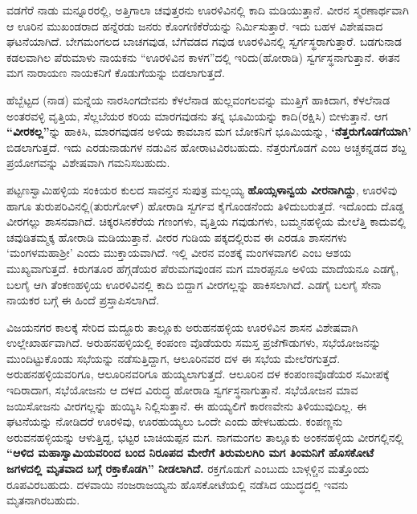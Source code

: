 ವಡಗೆರೆ ನಾಡು ಮನ್ನೂರರಲ್ಲಿ, ಅತ್ತಿಗಾಲಾ ಚವುತ್ತರನು ಊರಳಿವಿನಲ್ಲಿ ಕಾದಿ ಮಡಿಯುತ್ತಾನೆ. ವೀರನ ಸ್ಮರಣಾರ್ಥವಾಗಿ ಆ ಊರಿನ ಮುಖಂಡರಾದ ಹನ್ನೆರಡು ಜನರು ಕೊಂಗಣಿಕೆರೆಯನ್ನು ನಿರ್ಮಿಸುತ್ತಾರೆ. ಇದು ಬಹಳ ವಿಶೇಷವಾದ ಘಟನೆಯಾಗಿದೆ. ಬೇಗಮಂಗಲದ ಬಾಚಗವುಡ, ಬೆಗೆವಡದ ಗವುಡ ಊರಳಿವಿನಲ್ಲಿ ಸ್ವರ್ಗಸ್ಥರಾಗುತ್ತಾರೆ. ಬಡಗುನಾಡ ಕಡಲವಾಗಿಲ ಪೆರುಮಾಳು ನಾಯಕನು “ಊರಳಿವಿನ ಕಾಳಗ”ದಲ್ಲಿ ಇರಿದು(ಹೋರಾಡಿ) ಸ್ವರ್ಗಸ್ಥನಾಗುತ್ತಾನೆ. ಈತನ ಮಗ ನಾರಾಯಣ ನಾಯಕನಿಗೆ ಕೊಡುಗೆಯನ್ನು ಬಿಡಲಾಗುತ್ತದೆ.

ಹೆಬ್ಬೆಟ್ಟದ (ನಾಡ) ಮನ್ನೆಯ ನಾರಸಿಂಗದೇವನು ಕೆಳಲೆನಾಡ ಹುಲ್ಲವಂಗಲವನ್ನು ಮುತ್ತಿಗೆ ಹಾಕಿದಾಗ, ಕೆಳಲೆನಾಡ ಅಂತರವಳ್ಳಿ ವೃತ್ತಿಯ, ಸೆಲ್ಲಬೆಯರ ಕರಿಯ ಮಾರಗವುಡನು ತನ್ನ ಭೂಮಿಯನ್ನು ಕಾದಿ(ರಕ್ಷಿಸಿ) ಬೀಳುತ್ತಾನೆ. ಆಗ \textbf{“ವೀರಕಲ್ಲ”}ನ್ನು ಹಾಕಿಸಿ, ಮಾರಗವುಡನ ಅಳಿಯ ಕಾವಬಾನ ಮಗ ಬೋಕನಿಗೆ ಭೂಮಿಯನ್ನು, \textbf{‘ನೆತ್ತರುಗೊಡಗೆಯಾಗಿ’} ಬಿಡಲಾಗುತ್ತದೆ. ಇದು ಎರಡುನಾಡುಗಳ ನಡುವಿನ ಹೋರಾಟವಿರಬಹುದು. ನೆತ್ತರುಗೊಡಗೆ ಎಂಬ ಅಚ್ಚಕನ್ನಡದ ಶಬ್ದ ಪ್ರಯೋಗವನ್ನು ವಿಶೇಷವಾಗಿ ಗಮನಿಸಬಹುದು.

ಪಟ್ಟಣಸ್ವಾಮಿಹಳ್ಳಿಯ ಸಂಕಿಯರ ಕುಲದ ಸಾವನ್ತನ ಸುಪುತ್ರ ಮಲ್ಲಯ್ಯ \textbf{ಹೊಯ್ಸಳಾನ್ವಯ ವೀರನಾಗಿದ್ದು}, ಊರಳಿವು ಹಾಗೂ ತುರುಪರಿವಿನಲ್ಲಿ(ತುರುಗೋಳ್​) ಹೋರಾಡಿ ಸ್ವರ್ಗವ ಕೈಗೊಂಡನೆಂದು ತಿಳಿದುಬರುತ್ತದೆ. ಇದೊಂದು ದೊಡ್ಡ ವೀರಗಲ್ಲು ಶಾಸನವಾಗಿದೆ. ಚಿಕ್ಕರಸಿನಕೆರೆಯ ಗಣಂಗಳು, ವೃತ್ತಿಯ ಗವುಡುಗಳು, ಬಮ್ಮನಹಳ್ಳಿಯ ಮೇಲೆತ್ತಿ ಕಾದುವಲ್ಲಿ ಚವುಡಿತಮ್ಮಕ್ಕ ಹೋರಾಡಿ ಮಡಿಯುತ್ತಾನೆ. ವೀರರ ಗುಡಿಯ ಪಕ್ಕದಲ್ಲಿರುವ ಈ ಎರಡೂ ಶಾಸನಗಳು ‘ಮಂಗಳಮಹಾಶ‍್ರೀ’ ಎಂದು ಮುಕ್ತಾಯವಾಗಿದೆ. ಇಲ್ಲಿ ವೀರನ ವಂಶಕ್ಕೆ ಮಂಗಳವಾಗಲಿ ಎಂಬ ಆಶಯ ಮುಖ್ಯವಾಗುತ್ತದೆ. ಕಿರುಗತೂರ ಹೆಗ್ಗಡೆಯರ ಪೆರುಮಗವುಂಡನ ಮಗ ಮಾರಪ್ಪನೂ ಅಳಿಯ ಮಾದೆಯನೂ ಎಡಗೈ, ಬಲಗೈ ಆಗಿ ತೆಂಕಣಹಳ್ಳಿಯ ಊರಳಿವಿನಲ್ಲಿ ಕಾದಿ ಬಿದ್ದಾಗ ವೀರಗಲ್ಲನ್ನು ಹಾಕಿಸಲಾಗಿದೆ. ಎಡಗೈ ಬಲಗೈ ಸೇನಾ ನಾಯಕರ ಬಗ್ಗೆ ಈ ಹಿಂದೆ ಪ್ರಸ್ತಾಪಿಸಲಾಗಿದೆ.

ವಿಜಯನಗರ ಕಾಲಕ್ಕೆ ಸೇರಿದ ಮದ್ದೂರು ತಾಲ್ಲೂಕು ಅರುಹನಹಳ್ಳಿಯ ಊರಳಿವಿನ ಶಾಸನ ವಿಶೇಷವಾಗಿ ಉಲ್ಲೇಖಾರ್ಹವಾಗಿದೆ. ಅರುಹನಹಳ್ಳಿಯಲ್ಲಿ ಕಂಪಂಣ ವೊಡೆಯರು ಸಮಸ್ತ ಪ್ರಜೆಗೌಡುಗಳು, ಸಭೆಯೋಜನನ್ನು ಮುಂದಿಟ್ಟು\-ಕೊಂಡು ಸಭೆಯನ್ನು ನಡೆಸುತ್ತಿದ್ದಾಗ, ಆಲೂರಿನವರ ದಳ ಈ ಸಭೆಯ ಮೇಲೆರಗುತ್ತದೆ. ಅರುಹನಹಳ್ಳಿಯವರಿಗೂ, ಆಲೂರಿನವರಿಗೂ ಹುಯ್ಯಲಾಗುತ್ತದೆ. ಆಲೂರಿನ ದಳ ಕಂಪಂಣವೊಡೆಯರ ಸಮೀಪಕ್ಕೆ ಇದಿರಾದಾಗ, ಸಭೆಯೋಜನು ಆ ದಳದ ವಿರುದ್ಧ ಹೋರಾಡಿ ಸ್ವರ್ಗಸ್ಥನಾಗುತ್ತಾನೆ. ಸಭೆಯೋಜನ ಮಾವ ಜಯಿಸೋಜನು ವೀರಗಲ್ಲನ್ನು ಹುಯ್ಯಿಸಿ ನಿಲ್ಲಿಸುತ್ತಾನೆ. ಈ ಹುಯ್ಯಲಿಗೆ ಕಾರಣವೇನು ತಿಳಿಯುವುದಿಲ್ಲ. ಈ ಘಟನೆಯನ್ನು ನೋಡಿದರೆ ಊರಳಿವು, ಊರಹುಯ್ಯಲು ಒಂದೇ ಎಂದು ಹೇಳಬಹುದು. ಕಂಪಣ್ಣನು ಅರುವನಹಳ್ಳಿಯನ್ನು ಆಳುತ್ತಿದ್ದ, ಭಟ್ಟರ ಬಾಚಿಯಪ್ಪನ ಮಗ. ನಾಗಮಂಗಲ ತಾಲ್ಲೂಕು ಅಂಕನಹಳ್ಳಿಯ ವೀರಗಲ್ಲಿನಲ್ಲಿ \textbf{“ಆಳಿದ ಮಹಾಸ್ವಾಮಿಯವರಿಂದ ಬಂದ ನಿರೂಪದ ಮೇರೆಗೆ ತಿರುಮಲಗಿರಿ ಮಗ ತಿಂಮನಿಗೆ ಹೊಸಕೋಟೆ ಜಗಳದಲ್ಲಿ ಮೃತವಾದ ಬಗ್ಗೆ ರಕ್ತಾಕೊಡಗಿ” ನೀಡಲಾಗಿದೆ.} ರಕ್ತಗೊಡುಗೆ ಎಂಬುದು ಬಾಳ್ಗಳ್ಚಿನ ಮತ್ತೊಂದು ರೂಪವಿರಬಹುದು. ದಳವಾಯಿ ನಂಜರಾಜಯ್ಯನು ಹೊಸಕೋಟೆಯಲ್ಲಿ ನಡೆಸಿದ ಯುದ್ಧದಲ್ಲಿ ಇವನು ಮೃತನಾಗಿರಬಹುದು.


